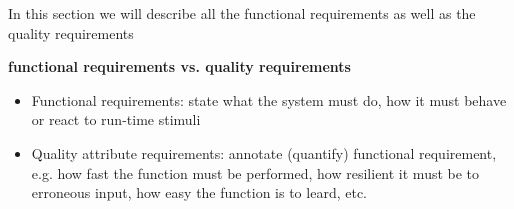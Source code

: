 In this section we will describe all the functional requirements
as well as the quality requirements

{\bf functional requirements vs. quality requirements}
\begin{itemize}
	\item Functional requirements: state what the system must do, how it must behave or react to run-time stimuli
	\item Quality attribute requirements: annotate (quantify) functional requirement, e.g. how fast the function 
	must be performed, how resilient it must be to erroneous input, how easy the function is to leard, etc.
\end{itemize}